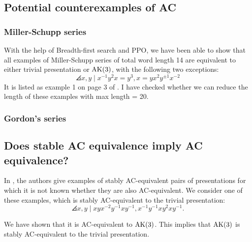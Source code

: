 \subsection{Potential counterexamples of AC}

\subsubsection{Miller-Schupp series}

With the help of Breadth-first search and PPO, we have been able to show that all examples of Miller-Schupp series of total word length 14 are equivalent to either trivial presentation or $\text{AK}(3)$, with the following two exceptions:
\[
\angles{x, y \mid x^{-1} y^2 x = y^{3} , x = y x^2 y^{\pm 1} x^{-2}}
\]
It is listed as example 1 on page 3 of \cite{MMS}.
I have checked whether we can reduce the length of these examples with max length = 20.


\subsubsection{Gordon's series}

\subsection{Does stable AC equivalence imply AC equivalence?}

In \cite{MMS}, the authors give examples of stably AC-equivalent pairs of presentations for which it is not known whether they are also AC-equivalent.
We consider one of these examples, which is stably AC-equivalent to the trivial presentation:
\[
\angles{x, y \mid xyx^{-2}y^{-1} xy^{-1}, x^{-1} y^{-1} x y^2 x y^{-1}}.
\]

We have shown that it is AC-equivalent to $\text{AK}(3)$.
This implies that $\text{AK}(3)$ is stably AC-equivalent to the trivial presentation.


